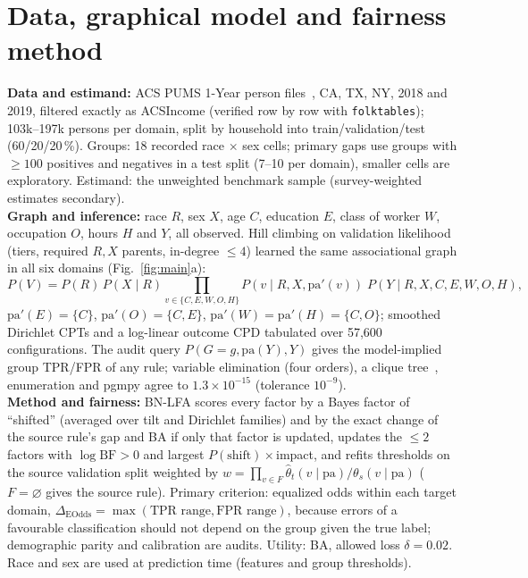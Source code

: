 \documentclass[11pt,a4paper]{article}
\newcommand{\EO}{\Delta_{\mathrm{EOdds}}}
\begin{document}
\section{Data, graphical model and fairness method}
\textbf{Data and estimand:} ACS PUMS 1-Year person files~\cite{census}, CA, TX, NY, 2018 and 2019, filtered exactly as
ACSIncome (verified row by row with \texttt{folktables}); 103k--197k persons per domain, split by household into
train/validation/test (60/20/20\,\%). Groups: 18 recorded race $\times$ sex cells; primary gaps use groups with
$\ge100$ positives and negatives in a test split (7--10 per domain), smaller cells are exploratory. Estimand: the
unweighted benchmark sample (survey-weighted estimates secondary).\\
\textbf{Graph and inference:} race $R$, sex $X$, age $C$, education $E$, class of worker $W$, occupation $O$, hours $H$
and $Y$, all observed. Hill climbing on validation likelihood (tiers, required $R,X$ parents, in-degree $\le4$) learned
the same associational graph in all six domains (Fig.~\ref{fig:main}a):
\[
P(V)=P(R)\,P(X\mid R)\!\!\prod_{v\in\{C,E,W,O,H\}}\!\!P(v\mid R,X,\mathrm{pa}'(v))\;P(Y\mid R,X,C,E,W,O,H),
\]
$\mathrm{pa}'(E)=\{C\}$, $\mathrm{pa}'(O)=\{C,E\}$, $\mathrm{pa}'(W)=\mathrm{pa}'(H)=\{C,O\}$; smoothed Dirichlet CPTs and
a log-linear outcome CPD tabulated over 57{,}600 configurations. The audit query $P(G{=}g,\mathrm{pa}(Y),Y)$ gives the
model-implied group TPR/FPR of any rule; variable elimination (four orders), a clique tree~\cite{koller}, enumeration and pgmpy agree
to $1.3\times10^{-15}$ (tolerance $10^{-9}$).\\
\textbf{Method and fairness:} BN-LFA scores every factor by a Bayes factor of ``shifted'' (averaged over tilt and
Dirichlet families) and by the exact change of the source rule's gap and BA if only that factor is updated, updates the
$\le2$ factors with $\log\mathrm{BF}>0$ and largest $P(\text{shift})\times$impact, and refits thresholds on the source
validation split weighted by $w=\prod_{v\in F}\hat\theta_t(v\mid\mathrm{pa})/\theta_s(v\mid\mathrm{pa})$
($F=\varnothing$ gives the source rule). Primary criterion: equalized odds within each target domain,
$\EO=\max(\text{TPR range},\text{FPR range})$, because errors of a favourable classification should not depend on the
group given the true label; demographic parity and calibration are audits. Utility: BA, allowed loss $\delta=0.02$. Race
and sex are used at prediction time (features and group thresholds).
\end{document}

